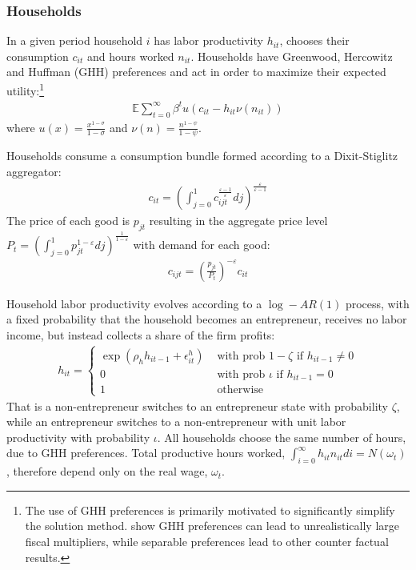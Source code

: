 \documentclass[titlepage]{\econtex}\newcommand{\texname}{ConsumptionHeterogeneity}
\begin{document}
\subsubsection{Households}
In a given period household $i$ has labor productivity $h_{it}$, chooses their consumption $c_{it}$ and hours worked $n_{it}$. Households have Greenwood, Hercowitz and Huffman (GHH) preferences and act in order to maximize their expected utility:\footnote{The use of GHH preferences is primarily motivated to significantly simplify the solution method. \cite{arGHH} show GHH preferences can lead to unrealistically large fiscal multipliers, while separable preferences lead to other counter factual results.}
\begin{align*}
\mathbb{E} \sum_{t=0}^{\infty}\beta^t  u(c_{it} -  h_{it} \nu(n_{it})) 
\end{align*}
where $u(x) = \frac{x^{1-\sigma}}{1-\sigma}$ and $\nu(n) = \frac{n^{1-\psi}}{1-\psi}$.

Households consume a consumption bundle formed according to a Dixit-Stiglitz aggregator:
\begin{align*}
c_{it} = \left(\int_{j=0}^{1} c_{ijt}^{\frac{\varepsilon-1}{\varepsilon}} dj \right)^{\frac{\varepsilon}{\varepsilon-1}}
\end{align*}
The price of each good is $p_{jt}$ resulting in the aggregate price level $P_t = \left(\int_{j=0}^{1} p_{jt}^{1-\varepsilon} dj \right)^{\frac{1}{1-\varepsilon}}$ with demand for each good:
\begin{align*}
c_{ijt} = \left(\frac{p_{jt}}{P_t} \right)^{-\varepsilon} c_{it}
\end{align*}

Household labor productivity evolves according to a $\log-AR(1)$ process, with a fixed probability that the household becomes an entrepreneur, receives no labor income, but instead collects a share of the firm profits:
\begin{align*}
h_{it} = \begin{cases}
				\exp(\rho_h h_{it-1} + \epsilon^h_{it}) &\text{ with prob } 1-\zeta \text{ if } h_{it-1} \ne 0\\
				0 &\text{  with prob } \iota \text{ if } h_{it-1} = 0 \\
				1	&\text{ otherwise}
\end{cases}
\end{align*}
That is a non-entrepreneur switches to an entrepreneur state with probability $\zeta$, while an entrepreneur switches to a non-entrepreneur with unit labor productivity with probability $\iota$. All households choose the same number of hours, due to GHH preferences. Total productive hours worked, $\int_{i=0}^{\infty} h_{it}n_{it}di = N(\omega_t)$, therefore depend only on the real wage, $\omega_t$.
\end{document}
